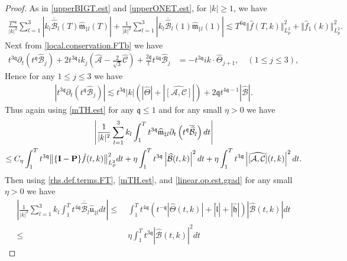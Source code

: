 \documentclass[10pt,a4paper]{amsart}
\newcommand{\highG}{\Theta}
\newcommand{\micro}{{\bf \{I- P\}}}
\def\norm#1{\big\Vert#1\big\Vert}
\newcommand{\pv}{p}
\newcommand{\qq}{\mathfrak{q}}
\newcommand{\tTq}{t^{3\qq}}
\newcommand{\tmq}{t^{-\qq}}
\newcommand{\tq}{t^{\qq}}
\begin{document}
\begin{proof}
As in \eqref{upperBIGT.est} and \eqref{upperONET.est}, for $|k|\geq 1$, we have 
\begin{align*}
 \frac{ T^{4\qq}}{|k|^2}
\sum_{l=1}^3 
    \left| k_l\overline{\widehat{\mathcal{B}}}_l(T) \widehat{\mathfrak{m}}_{\ddagger l} (T)
\right|
+ \frac{ 1}{|k|^2}
\sum_{l=1}^3 
\left| k_l\overline{\widehat{\mathcal{B}}}_l(1) \widehat{\mathfrak{m}}_{\ddagger l} (1)\right|
\lesssim
 T^{6\qq}\Vert \hat{f}(T,k)\Vert_{L^2_{\pv}}^2
 +
 \norm{ \hat{f}_1(k)}_{L^2_{\pv}}^2.
\end{align*}
Next from \eqref{local.conservation.FTb} we have 
\begin{align*}
\tTq\partial_t\left(\tq {\widehat{\mathcal{B}}}_j\right)
 +
2\tTq ik_j \left( \widehat{\mathcal{A}}
-\frac{2}{\sqrt{3}}
\widehat{\mathcal{C}}  \right)
+
\frac{2\qq }{t}t^{4\qq}\widehat{\mathcal{B}}_j
&=- \tTq ik \cdot \widehat{\highG}_{j+1}, \quad (1 \leq j \leq 3),
\end{align*}
Hence for any $1 \leq j \leq 3$ we have
\begin{align*}
  \left|  \tTq\partial_t\left(\tq {\widehat{\mathcal{B}}}_j\right) \right|
 \lesssim 
\tTq |k| \left(\left| \widehat{\highG}\right|+\left|\widehat{[\mathcal{A},\mathcal{C}]}\right|\right)
+
2\qq  t^{4\qq -1}\left|{\widehat{\mathcal{B}}}\right|.
\end{align*}
Thus again using \eqref{mTH.est} for any $\qq \leq 1$ and for any small $\eta>0$ we have
\begin{multline*}
    \left|
 \frac{1}{|k|^2 } 
 \sum_{l=1}^3 
   k_l \int_1^{T} \tTq \widehat{\mathfrak{m}}_{\ddagger l}\partial_t\left(\tq\overline{\widehat{\mathcal{B}}}_l\right)  dt
\right|
\\
\leq
C_\eta\int_1^{T} \tTq\norm{\micro \hat{f}(t,k)}_{L^2_{\pv}}^2dt
+
\eta \int^{T}_{1} \tTq \left|\widehat{{\mathcal{B}}}(t,k)\right|^2 dt 
+
\eta \int^{T}_{1} \tTq \left|\widehat{[\mathcal{A},\mathcal{C}]}(t,k)\right|^2 dt. 
\end{multline*}
Then using \eqref{rhs.def.terms.FT}, \eqref{mTH.est}, and \eqref{linear.op.est.grad} for any small $\eta>0$ we have
\begin{align*}
\left|  \frac{1 }{|k|^2}
\sum_{l=1}^3
k_l \int_1^{T}  t^{4\qq} \overline{\widehat{\mathcal{B}}}_l \widehat{\mathfrak{u}}_{\ddagger l} dt\right|
 \leq &~
\int_1^{T}
 t^{4\qq}\left( \tmq\left|\widehat{\highG}(t,k)\right|+\left| \widehat{\mathfrak{l}}\right|+\left| \widehat{\mathfrak{h}}\right|\right) \left|\widehat{{\mathcal{B}}}(t,k)\right| dt
 \\
  \leq &~
  \eta \int^{T}_{1} \tTq  \left|\widehat{{\mathcal{B}}}(t,k)\right|^2 dt

\end{align*}
\end{proof}
\end{document}
